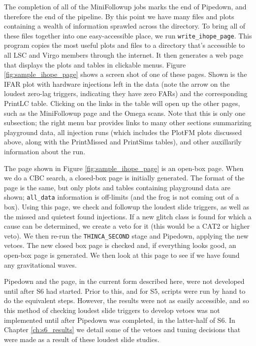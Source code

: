 The completion of all of the MiniFollowup jobs marks the end of Pipedown, and therefore the end of the \ihope pipeline. By this point we have many files and plots containing a wealth of information sprawled across the \ihope directory. To bring all of these files together into one easy-accessible place, we run \verb|write_ihope_page|. This program copies the most useful plots and files to a directory that's accessible to all \ac{LSC} and Virgo members through the internet. It then generates a web page that displays the plots and tables in clickable menus. Figure \ref{fig:sample_ihope_page} shows a screen shot of one of these \ihope pages. Shown is the IFAR plot with hardware injections left in the data (note the arrow on the loudest zero-lag triggers, indicating they have zero \acp{FAR}) and the corresponding PrintLC table. Clicking on the links in the table will open up the other pages, such as the MiniFollowup page and the Omega scans. Note that this is only one subsection; the right menu bar provides links to many other sections summarizing playground data, all injection runs (which includes the PlotFM plots discussed above, along with the PrintMissed and PrintSims tables), and other auxillarily information about the run.

The page shown in Figure \ref{fig:sample_ihope_page} is an open-box page. When we do a \ac{CBC} search, a closed-box \ihope page is initially generated. The format of the page is the same, but only plots and tables containing playground data are shown; \verb|all_data| information is off-limits (and the frog is not coming out of a box). Using this page, we check and followup the loudest slide triggers, as well as the missed and quietest found injections. If a new glitch class is found for which a cause can be determined, we create a veto for it (this would be a CAT2 or higher veto). We then re-run the \verb|THINCA_SECOND| stage and Pipedown, applying the new vetoes. The new closed box page is checked and, if everything looks good, an open-box page is generated. We then look at this page to see if we have found any gravitational waves.

Pipedown and the \ihope page, in the current form described here, were not developed until after \ac{S6} had started. Prior to this, and for \ac{S5}, scripts were run by hand to do the equivalent steps. However, the results were not as easily accessible, and so this method of checking loudest slide triggers to develop vetoes was not implemented until after Pipedown was completed, in the latter-half of \ac{S6}. In Chapter \ref{ch:s6_results} we detail some of the vetoes and tuning decisions that were made as a result of these loudest slide studies.

